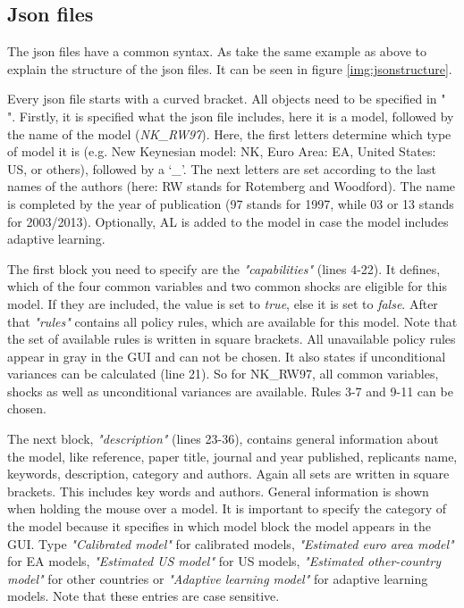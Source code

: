 \subsection*{Json files}
The json files have a common syntax. As take the same example as above to explain the structure of the json files. It can be seen in figure \ref{img:jsonstructure}.

Every json file starts with a curved bracket. All objects need to be specified in " ". Firstly, it is specified what the json file includes, here it is a model, followed by the name of the model (\textit{NK\_RW97}). Here, the first letters determine which type of model it is (e.g. New Keynesian model: NK, Euro Area: EA, United States: US, or others), followed by a `\textit{\_}'. The next letters are set according to the last names of the authors (here: RW stands for Rotemberg and Woodford). The name is completed by the year of publication (97 stands for 1997, while 03 or 13 stands for 2003/2013). Optionally, AL is added to the model in case the model includes adaptive learning. 

The first block you need to specify are the \textit{"capabilities"} (lines 4-22). It defines, which of the four common variables and two common shocks are eligible for this model. If they are included, the value is set to \textit{true}, else it is set to \textit{false}. After that \textit{"rules"} contains all policy rules, which are available for this model. Note that the set of available rules is written in square brackets. All unavailable policy rules appear in gray in the GUI and can not be chosen.
It also states if unconditional variances can be calculated (line 21). So for NK\_RW97, all common variables, shocks as well as unconditional variances are available. Rules 3-7 and 9-11 can be chosen. 

The next block, \textit{"description"} (lines 23-36), contains general information about the model, like reference, paper title, journal and year published, replicants name, keywords, description, category and authors. Again all sets are written in square brackets. This includes key words and authors. General information is shown when holding the mouse over a model. It is important to specify the category of the model because it specifies in which model block the model appears in the GUI. Type \textit{"Calibrated model"} for calibrated models, \textit{"Estimated euro area model"} for EA models, \textit{"Estimated US model"} for US models, \textit{"Estimated other-country model"} for other countries or \textit{"Adaptive learning model"} for adaptive learning models. Note that these entries are case sensitive.

